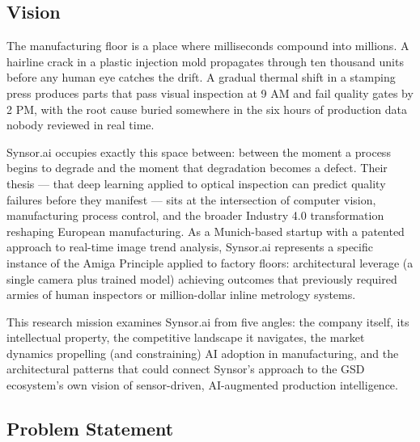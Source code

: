 \documentclass[11pt,letterpaper]{article}
\begin{document}
\subsection{Vision}

The manufacturing floor is a place where milliseconds compound into millions. A hairline crack in a plastic injection mold propagates through ten thousand units before any human eye catches the drift. A gradual thermal shift in a stamping press produces parts that pass visual inspection at 9 AM and fail quality gates by 2 PM, with the root cause buried somewhere in the six hours of production data nobody reviewed in real time.

Synsor.ai occupies exactly this space between: between the moment a process begins to degrade and the moment that degradation becomes a defect. Their thesis --- that deep learning applied to optical inspection can predict quality failures before they manifest --- sits at the intersection of computer vision, manufacturing process control, and the broader Industry 4.0 transformation reshaping European manufacturing. As a Munich-based startup with a patented approach to real-time image trend analysis, Synsor.ai represents a specific instance of the Amiga Principle applied to factory floors: architectural leverage (a single camera plus trained model) achieving outcomes that previously required armies of human inspectors or million-dollar inline metrology systems.

This research mission examines Synsor.ai from five angles: the company itself, its intellectual property, the competitive landscape it navigates, the market dynamics propelling (and constraining) AI adoption in manufacturing, and the architectural patterns that could connect Synsor's approach to the GSD ecosystem's own vision of sensor-driven, AI-augmented production intelligence.

\subsection{Problem Statement}
\end{document}
